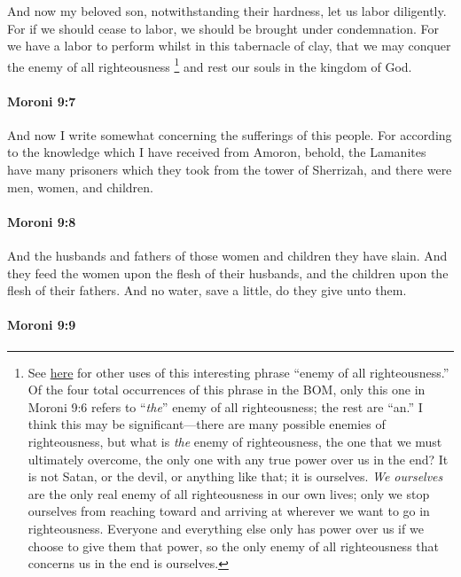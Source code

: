 			And now my beloved son,
			notwithstanding their hardness, let us labor diligently.
			For if we should cease to labor,
			we should be brought under condemnation.
			For we have a labor to perform whilst in this tabernacle of clay,
			that we may conquer the enemy of all righteousness%
				\footnote{%
					\label{MORONI-9-6-NOTE-enemy}%
					See \hyperref[ENEMY-PHRASES]{here} for other uses of this interesting phrase ``enemy of all righteousness.'' Of the four total occurrences of this phrase in the BOM, only this one in Moroni 9:6 refers to ``\textit{the}'' enemy of all righteousness; the rest are ``an.'' I think this may be significant---there are many possible enemies of righteousness, but what is \textit{the} enemy of righteousness, the one that we must ultimately overcome, the only one with any true power over us in the end? It is not Satan, or the devil, or anything like that; it is ourselves. \textit{We ourselves} are the only real enemy of all righteousness in our own lives; only we stop ourselves from reaching toward and arriving at wherever we want to go in righteousness. Everyone and everything else only has power over us if we choose to give them that power, so the only enemy of all righteousness that concerns us in the end is ourselves.
					}
			and rest our souls in the kingdom of God.

		\paragraph{Moroni 9:7} %
			\label{MORONI-9-7}

			And now I write somewhat concerning the sufferings of this people.
			For according to the knowledge which I have received from Amoron,
			behold, the Lamanites have many prisoners
			which they took from the tower of Sherrizah,
			and there were men, women, and children.

		\paragraph{Moroni 9:8} %
			\label{MORONI-9-8}

			And the husbands and fathers of those women and children they have slain.
			And they feed the women upon the flesh of their husbands,
			and the children upon the flesh of their fathers.
			And no water, save a little, do they give unto them.

		\paragraph{Moroni 9:9} %
			\label{MORONI-9-9}

